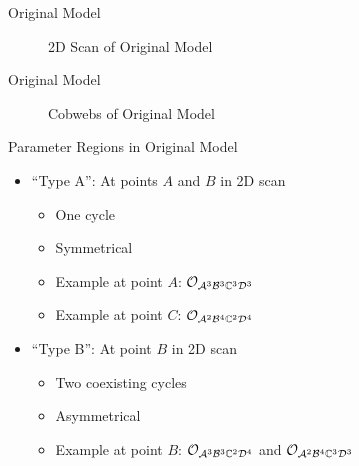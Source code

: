 \begin{frame}{Original Model}
    \vspace{-2.0em}
    \begin{figure}
        \centering
        \caption{2D Scan of Original Model}
    \end{figure}
\end{frame}

\begin{frame}{Original Model}
    \vspace{-3.0em}
    \begin{figure}
        \centering
        \caption{Cobwebs of Original Model}
    \end{figure}
\end{frame}

\begin{frame}{Parameter Regions in Original Model}
    \begin{itemize}
        \item ``Type A'': At points $A$ and $B$ in 2D scan
              \begin{itemize}
                  \item One cycle
                  \item Symmetrical
                  \item Example at point $A$: $\mathcal{O}_{\mathcal{A}^3\mathcal{B}^3\mathbb{C}^3\mathcal{D}^3}$
                  \item Example at point $C$: $\mathcal{O}_{\mathcal{A}^2\mathcal{B}^4\mathbb{C}^2\mathcal{D}^4}$ \vspace*{1em}
              \end{itemize}
        \item ``Type B'': At point $B$ in 2D scan
              \begin{itemize}
                  \item Two coexisting cycles
                  \item Asymmetrical
                  \item Example at point $B$: $\mathcal{O}_{\mathcal{A}^3\mathcal{B}^3\mathbb{C}^2\mathcal{D}^4}$ and $\mathcal{O}_{\mathcal{A}^2\mathcal{B}^4\mathbb{C}^3\mathcal{D}^3}$
              \end{itemize}
    \end{itemize}
\end{frame}

